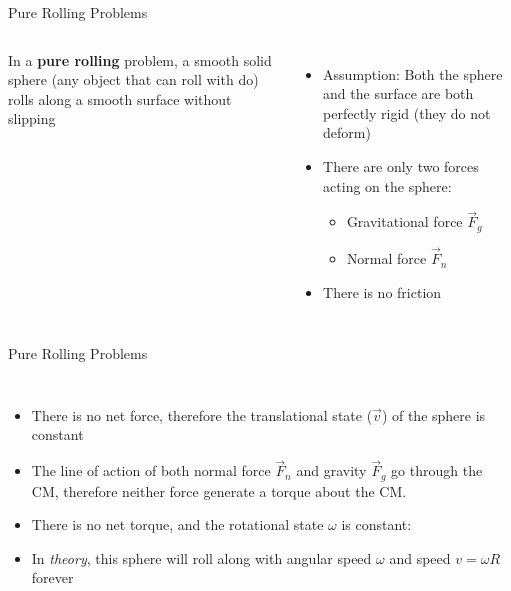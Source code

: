 \documentclass[12pt,compress,aspectratio=169]{beamer}
\begin{document}
\begin{frame}{Pure Rolling Problems}
  \begin{columns}
    

    In a \textbf{pure rolling} problem, a smooth solid sphere (any object that
    can roll with do) rolls along a smooth surface without slipping
    \begin{itemize}
    \item Assumption: Both the sphere and the surface are both perfectly rigid
      (they do not deform)
    \item There are only two forces acting on the sphere:
      \begin{itemize}
      \item Gravitational force $\vec F_g$
      \item Normal force $\vec F_n$
      \end{itemize}
    \item There is no friction
    \end{itemize}
  \end{columns}
\end{frame}



\begin{frame}{Pure Rolling Problems}
  \begin{columns}
    \begin{itemize}
    \item There is no net force, therefore the translational state ($\vec v$)
      of the sphere is constant

    \item The line of action of both normal force $\vec F_n$ and gravity
      $\vec F_g$ go through the CM, therefore neither force generate a torque
      about the CM.
    \item There is no net torque, and the rotational state $\omega$ is
      constant:

    \item In \emph{theory}, this sphere will roll along with angular speed
      $\omega$ and speed $v=\omega R$ forever
    \end{itemize}

    
  \end{columns}
\end{frame}
\end{document}
